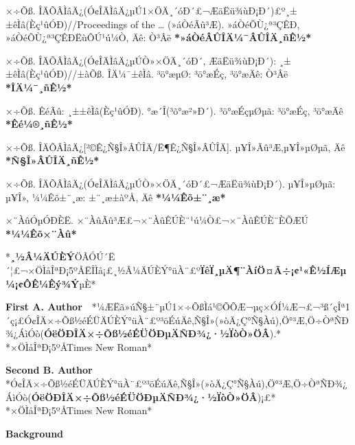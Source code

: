 \documentclass[10.5pt,compsoc]{CjC}
\theoremstyle{mystyle}
\begin{document}
\begin{CJK*}{GBK}{song}
\begin{thebibliography}{99}
×÷Õß.
ÎÄÕÂÌâÄ¿(Ó¢ÎÄÌâÄ¿µÚ1×ÖÄ¸´óÐ´£¬ÆäËü¾ùÐ¡Ð´)£º¸±±êÌâ(Èç¹ûÓÐ)//Proceedings of
the {\ldots} (»áÒéÃû³Æ). »áÒéÕÙ¿ª³ÇÊÐ, »áÒéÕÙ¿ª³ÇÊÐËùÔÚ¹ú¼Ò, Äê: Ò³Âë
\textbf{*»áÒéÂÛÎÄ¼¯ÂÛÎÄ¸ñÊ½*}

×÷Õß. ÎÄÕÂÌâÄ¿(Ó¢ÎÄÌâÄ¿µÚÒ»×ÖÄ¸´óÐ´, ÆäËü¾ùÐ¡Ð´):
¸±±êÌâ(Èç¹ûÓÐ)//±àÕß. ÎÄ¼¯±êÌâ. ³ö°æµØ: ³ö°æÉç, ³ö°æÄê: Ò³Âë
\textbf{*ÎÄ¼¯¸ñÊ½*}

×÷Õß. ÊéÃû: ¸±±êÌâ(Èç¹ûÓÐ). °æ´Î(³õ°æ²»Ð´). ³ö°æÉçµØµã: ³ö°æÉç,
³ö°æÄê \textbf{*Êé¼®¸ñÊ½*}

×÷Õß. ÎÄÕÂÌâÄ¿[²©Ê¿Ñ§Î»ÂÛÎÄ/Ë¶Ê¿Ñ§Î»ÂÛÎÄ]. µ¥Î»Ãû³Æ,µ¥Î»µØµã, Äê
\textbf{*Ñ§Î»ÂÛÎÄ¸ñÊ½*}

×÷Õß. ÎÄÕÂÌâÄ¿(Ó¢ÎÄÌâÄ¿µÚÒ»×ÖÄ¸´óÐ´£¬ÆäËü¾ùÐ¡Ð´). µ¥Î»µØµã: µ¥Î»,
¼¼Êõ±¨¸æ: ±¨¸æ±àºÅ, Äê \textbf{*¼¼Êõ±¨¸æ*}

×¨ÀûÓµÓÐÈË. ×¨ÀûÃû³Æ£¬×¨ÀûÊÚÈ¨¹ú¼Ò£¬×¨ÀûÊÚÈ¨ÈÕÆÚ
\textbf{*¼¼Êõ×¨Àû*}
  \end{thebibliography}

\begin{strip}
\end{strip}


{\setlength\parindent{2em}
*\textbf{¸½Â¼ÄÚÈÝ}ÖÃÓÚ´Ë´¦£¬×ÖÌåÎªÐ¡5ºÅËÎÌå¡£¸½Â¼ÄÚÈÝ°üÀ¨£º\textbf{ÏêÏ¸µÄ¶¨ÀíÖ¤Ã÷¡¢¹«Ê½ÍÆµ¼¡¢Ô­Ê¼Êý¾Ý}µÈ*}

\begin{strip}
\end{strip}

\begin{biography}
\noindent
\textbf{First A. Author}\ \ *¼ÆËã»úÑ§±¨µÚ1×÷ÕßÌá¹©ÕÕÆ¬µç×ÓÍ¼Æ¬£¬³ß´çÎª1´ç¡£Ó¢ÎÄ×÷Õß½éÉÜÄÚÈÝ°üÀ¨£º³öÉúÄê,Ñ§Î»(»òÄ¿Ç°Ñ§Àú),Ö°³Æ,Ö÷ÒªÑÐ¾¿ÁìÓò(\textbf{ÓëÖÐÎÄ×÷Õß½éÉÜÖÐµÄÑÐ¾¿·½ÏòÒ»ÖÂ}).*
*×ÖÌåÎªÐ¡5ºÅTimes New Roman*

\end{biography}

\begin{biography}
\noindent
\textbf{Second B. Author} *Ó¢ÎÄ×÷Õß½éÉÜÄÚÈÝ°üÀ¨£º³öÉúÄê,Ñ§Î»(»òÄ¿Ç°Ñ§Àú),Ö°³Æ,Ö÷ÒªÑÐ¾¿ÁìÓò(\textbf{ÓëÖÐÎÄ×÷Õß½éÉÜÖÐµÄÑÐ¾¿·½ÏòÒ»ÖÂ})¡£*
*×ÖÌåÎªÐ¡5ºÅTimes New Roman*
\end{biography}
\begin{strip}
\end{strip}
\noindent \textbf{Background}

\end{CJK*}
\end{document}
